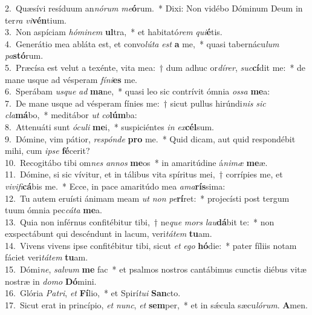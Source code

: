 {2.~}Quæsívi resíduum an\textit{nó}\textit{rum} \textit{me}\textbf{ó}rum.~* Dixi: Non vidébo Dóminum Deum in ter\textit{ra} \textit{vi}\textbf{vén}tium.\\
{3.~}Non aspíciam \textit{hó}\textit{mi}\textit{nem} \textbf{ul}tra,~* et habitató\textit{rem} \textit{qui}\textbf{é}tis.\\
{4.~}Generátio mea abláta est, et convo\textit{lú}\textit{ta} \textit{est} \textbf{a} me,~* quasi tabernácu\textit{lum} \textit{pa}\textbf{stó}rum.\\
{5.~}Præcísa est velut a texénte, vita mea:~† dum adhuc or\textit{dí}\textit{rer}, \textit{suc}\textbf{cí}dit me:~* de mane usque ad vésperam \textit{fí}\textit{ni}\textbf{es} me.\\
{6.~}Sperábam \textit{us}\textit{que} \textit{ad} \textbf{ma}ne,~* quasi leo sic contrívit ómnia \textit{os}\textit{sa} \textbf{me}a:\\
{7.~}De mane usque ad vésperam fínies me:~† sicut pullus hirúndi\textit{nis} \textit{sic} \textit{cla}\textbf{má}bo,~* meditábor \textit{ut} \textit{co}\textbf{lúm}ba:\\
{8.~}Attenuáti sunt \textit{ó}\textit{cu}\textit{li} \textbf{me}i,~* suspiciéntes \textit{in} \textit{ex}\textbf{cél}sum.\\
{9.~}Dómine, vim pátior, \textit{re}\textit{spón}\textit{de} \textbf{pro} me.~* Quid dicam, aut quid respondébit mihi, cum \textit{i}\textit{pse} \textbf{fé}cerit?\\
{10.~}Recogitábo tibi om\textit{nes} \textit{an}\textit{nos} \textbf{me}os~* in amaritúdine á\textit{ni}\textit{mæ} \textbf{me}æ.\\
{11.~}Dómine, si sic vívitur, et in tálibus vita spíritus mei,~† corrípies me, et \textit{vi}\textit{vi}\textit{fi}\textbf{cá}bis me.~* Ecce, in pace amaritúdo mea \textit{a}\textit{ma}\textbf{rís}sima:\\
{12.~}Tu autem eruísti ánimam meam \textit{ut} \textit{non} \textit{pe}\textbf{rí}ret:~* projecísti post tergum tuum ómnia pec\textit{cá}\textit{ta} \textbf{me}a.\\
{13.~}Quia non inférnus confitébitur tibi,~† ne\textit{que} \textit{mors} \textit{lau}\textbf{dá}bit te:~* non exspectábunt qui descéndunt in lacum, veri\textit{tá}\textit{tem} \textbf{tu}am.\\
{14.~}Vivens vivens ipse confitébitur tibi, sicut \textit{et} \textit{e}\textit{go} \textbf{hó}die:~* pater fíliis notam fáciet veri\textit{tá}\textit{tem} \textbf{tu}am.\\
{15.~}Dómi\textit{ne}, \textit{sal}\textit{vum} \textbf{me} fac~* et psalmos nostros cantábimus cunctis diébus vitæ nostræ in \textit{do}\textit{mo} \textbf{Dó}mini.\\
{16.~}Glória \textit{Pa}\textit{tri}, \textit{et} \textbf{Fí}lio,~* et Spirí\textit{tu}\textit{i} \textbf{San}cto.\\
{17.~}Sicut erat in princípio, \textit{et} \textit{nunc}, \textit{et} \textbf{sem}per,~* et in sǽcula sæcu\textit{ló}\textit{rum}. \textbf{A}men.\\
